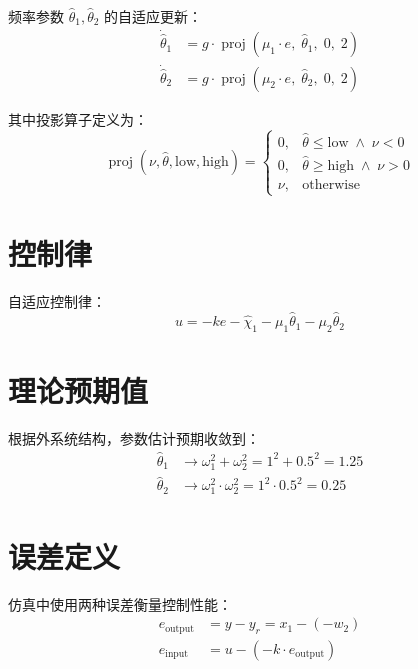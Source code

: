 \documentclass[12pt,a4paper]{article}
\begin{document}
频率参数 $\hat{\theta}_1, \hat{\theta}_2$ 的自适应更新：
\begin{align}
\dot{\hat{\theta}}_1 &= g \cdot \operatorname{proj}(\mu_1 \cdot e,\; \hat{\theta}_1,\; 0,\; 2) \label{eq:theta1} \\
\dot{\hat{\theta}}_2 &= g \cdot \operatorname{proj}(\mu_2 \cdot e,\; \hat{\theta}_2,\; 0,\; 2) \label{eq:theta2}
\end{align}

其中投影算子定义为：
\begin{equation}
\operatorname{proj}(\nu, \hat{\theta}, \text{low}, \text{high}) =
\begin{cases}
0, & \hat{\theta} \leq \text{low} \;\land\; \nu < 0 \\
0, & \hat{\theta} \geq \text{high} \;\land\; \nu > 0 \\
\nu, & \text{otherwise}
\end{cases}
\label{eq:proj}
\end{equation}

\section{控制律}

自适应控制律：
\begin{equation}
u = -k e - \hat{\chi}_1 - \mu_1\hat{\theta}_1 - \mu_2\hat{\theta}_2
\label{eq:control}
\end{equation}

\section{理论预期值}

根据外系统结构，参数估计预期收敛到：
\begin{align}
\hat{\theta}_1 &\to \omega_1^2 + \omega_2^2 = 1^2 + 0.5^2 = 1.25 \label{eq:conv1} \\
\hat{\theta}_2 &\to \omega_1^2 \cdot \omega_2^2 = 1^2 \cdot 0.5^2 = 0.25 \label{eq:conv2}
\end{align}

\section{误差定义}

仿真中使用两种误差衡量控制性能：
\begin{align}
e_{\text{output}} &= y - y_r = x_1 - (-w_2) \label{eq:eout} \\
e_{\text{input}} &= u - (-k \cdot e_{\text{output}}) \label{eq:ein}
\end{align}
\end{document}
